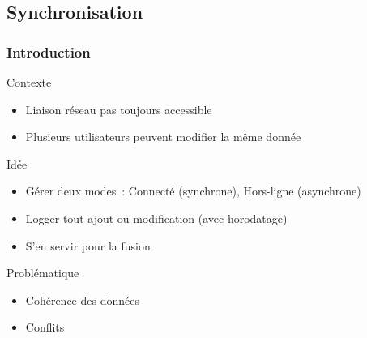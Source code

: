 \subsection{Synchronisation}

\begin{frame}
\tableofcontents[subsectionstyle=show/shaded/hide, subsubsectionstyle=hide, sectionstyle=show/hide]
\end{frame}

\begin{frame}
\frametitle{Introduction}

\begin{block}{Contexte}
\begin{itemize}
    \item Liaison réseau pas toujours accessible
    \item Plusieurs utilisateurs peuvent modifier la même donnée
\end{itemize}
\end{block}

\pause

\begin{exampleblock}{Idée}
\begin{itemize}
    \item Gérer deux modes~: Connecté (synchrone), Hors-ligne (asynchrone)
    \item Logger tout ajout ou modification (avec horodatage)
    \item S'en servir pour la fusion
\end{itemize}
\end{exampleblock}

\pause

\begin{alertblock}{Problématique}
\begin{itemize}
    \item Cohérence des données
    \item Conflits
\end{itemize}
\end{alertblock}

\end{frame} %

